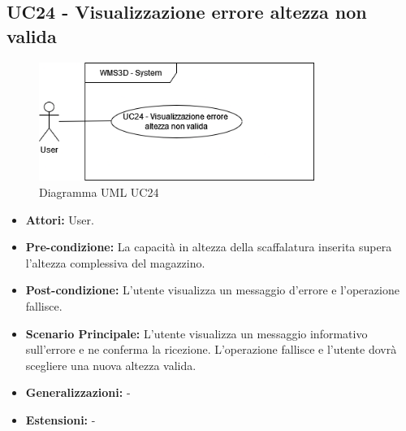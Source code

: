 \subsection{UC24 - Visualizzazione errore altezza non valida}
\begin{figure}[H]
  \centering
  \includegraphics[width=0.8\textwidth]{UC_diagrams_21-26/UC24.drawio.png}
   \caption{Diagramma UML UC24}
\end{figure}
\begin{itemize}
    \item \textbf{Attori:} User.
    \item \textbf{Pre-condizione:}  La capacità in altezza della scaffalatura inserita supera l'altezza complessiva del magazzino.
    \item \textbf{Post-condizione:} L'utente visualizza un messaggio d'errore e l'operazione fallisce.
    \item \textbf{Scenario Principale:}  L'utente visualizza un messaggio informativo sull'errore e ne conferma la ricezione. L'operazione fallisce e l'utente dovrà scegliere una nuova altezza valida.
    \item \textbf{Generalizzazioni:} -
    \item \textbf{Estensioni:} -
\end{itemize}